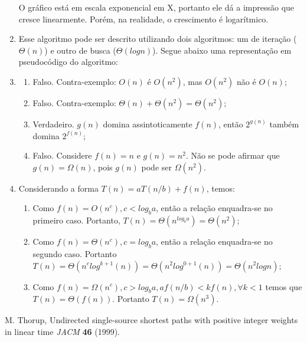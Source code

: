 \documentclass[11pt]{article}
\begin{document}
\begin{enumerate}
    O gráfico está em escala exponencial em X, portanto ele dá a impressão que
cresce linearmente. Porém, na realidade, o crescimento é logarítmico.
        \item Esse algoritmo pode ser descrito utilizando dois algoritmos: um
de iteração ($\Theta(n)$) e outro de busca ($\Theta(logn)$). Segue abaixo uma
representação em pseudocódigo do algoritmo:
        \begin{algorithmic}[1]
                 
                        \State {}
                    \EndIf
                \EndFor
                \State {}
            \EndFunction
        \end{algorithmic}
        \item
            \begin{enumerate}
                \item Falso. Contra-exemplo: $O(n)$ é $O(n^2)$, mas $O(n^2)$ não é $O(n)$;
                \item Falso. Contra-exemplo: $\Theta(n) + \Theta(n^2) = \Theta(n^2)$;
                \item Verdadeiro. $g(n)$ domina assintoticamente $f(n)$, então $2^{g(n)}$ também domina $2^{f(n)}$;
                \item Falso. Considere $f(n) = n$ e $g(n) = n^2$. Não se pode afirmar que $g(n) = \Omega(n)$, pois $g(n)$ pode ser $\Omega(n^2)$.
            \end{enumerate}
        \item Considerando a forma $T(n) = aT(n/b) + f(n)$, temos:
            \begin{enumerate}
                \item Como $f(n) = O(n^c), c < log_ba$, então a relação
                    enquadra-se no primeiro caso. Portanto, $T(n) = \Theta(n^{log_ba}) = \Theta(n^2)$;
                \item Como $f(n) = \Theta(n^c), c = log_ba$, então a relação enquadra-se no segundo caso. Portanto 
                    $T(n) = \Theta(n^{c}log^{k+1}(n)) = \Theta(n^{2}log^{0+1}(n)) = \Theta(n^2logn)$;
                \item Como $f(n) = \Omega(n^c), c > log_ba, af(n/b) < kf(n), \forall k<1$ temos que $T(n) = \Theta(f(n))$. Portanto $T(n) = \Omega(n^3)$.
            \end{enumerate}
\end{enumerate}

\begin{thebibliography}{1}
    M. Thorup, Undirected single-source shortest paths with positive integer
weights in linear time {\em JACM} {\bf 46} (1999).  \end{thebibliography}
\end{document}
